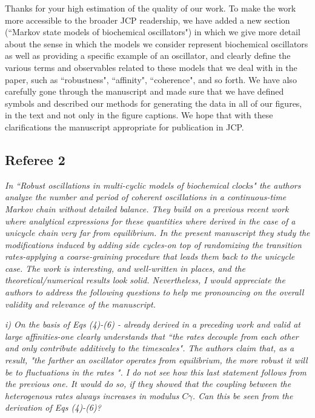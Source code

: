 \documentclass[amsmath, preprintnumbers, 12pt, onecolumn, pre, longbibliograpy]{revtex4-1}
\begin{document}
Thanks for your high estimation of the quality of our work. To make the work more accessible to the broader JCP readership, we have added a new section (``Markov state models of biochemical oscillators") in which we give more detail about the sense in which the models we consider represent biochemical oscillators as well as providing a specific example of an oscillator, and clearly define the various terms and observables related to these models that we deal with in the paper, such as ``robustness", ``affinity", ``coherence", and so forth. We have also carefully gone through the manuscript and made sure that we have defined symbols and described our methods for generating the data in all of our figures, in the text and not only in the figure captions. We hope that with these clarifications the manuscript appropriate for publication in JCP.


\subsection*{Referee 2}

\textit{In ``Robust oscillations in multi-cyclic models of biochemical clocks" the authors analyze the number and period of coherent oscillations in a continuous-time Markov chain without detailed balance. They build on a previous recent work where analytical expressions for these quantities where derived in the case of a unicycle chain very far from equilibrium. In the present manuscript they study the modifications induced by adding side cycles-on top of randomizing the transition rates-applying a coarse-graining procedure that leads them back to the unicycle case. The work is interesting, and well-written in places, and the theoretical/numerical results look solid. Nevertheless, I would appreciate the authors to address the following questions to help me pronouncing on the overall validity and relevance of the manuscript.}

\textit{i) On the basis of Eqs (4)-(6) - already derived in a preceding work and valid at large affinities-one clearly understands that ``the rates decouple from each other and only contribute additively to the timescales". The authors claim that, as a result, "the farther an oscillator operates from equilibrium, the more robust it will be to fluctuations in the rates ". I do not see how this last statement follows from the previous one. It would do so, if they showed that the coupling between the heterogenous rates always increases in modulus $C \gamma$. Can this be seen from the derivation of Eqs (4)-(6)?}
\end{document}
